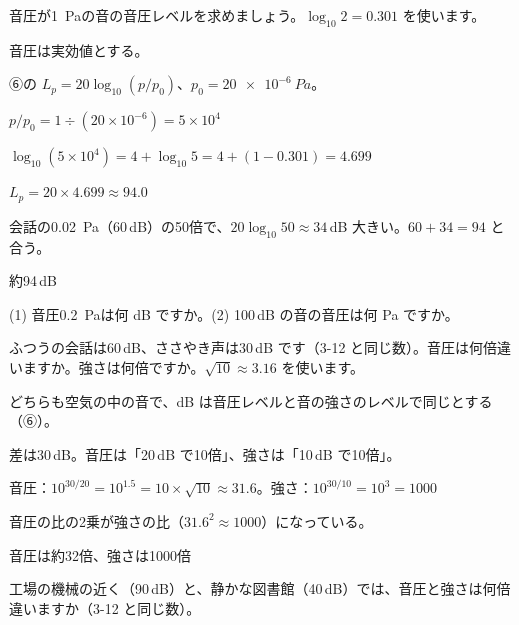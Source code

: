 \begin{reidai}[1 Pa は何 dB？]
\label{ph:波-9:ex7}音圧が\qty{1}{Pa}の音の音圧レベルを求めましょう。$\log_{10}2=0.301$ を使います。
\par{} 音圧は実効値とする。
\par\kangaekata ⑥の $L_p=20\log_{10}(p/p_0)$、$p_0=\qty{20e-6}{Pa}$。
\par\shiki $p/p_0=1\div(20\times10^{-6})=5\times10^4$
\par\hspace*{2\zw}$\log_{10}(5\times10^4)=4+\log_{10}5=4+(1-0.301)=4.699$
\par\hspace*{2\zw}$L_p=20\times4.699\approx94.0$
\par{} 会話の\qty{0.02}{Pa}（60\,dB）の50倍で、$20\log_{10}50\approx34$\,dB 大きい。$60+34=94$ と合う。
\par\kotae 約94\,dB
\end{reidai}
\begin{jibun}
(1) 音圧\qty{0.2}{Pa}は何 dB ですか。(2) 100\,dB の音の音圧は何 Pa ですか。
\end{jibun}

\begin{reidai}[会話とささやき声の音圧の比]
\label{ph:波-9:ex8}ふつうの会話は60\,dB、ささやき声は30\,dB です（3-12 と同じ数）。音圧は何倍違いますか。強さは何倍ですか。$\sqrt{10}\approx3.16$ を使います。
\par{} どちらも空気の中の音で、dB は音圧レベルと音の強さのレベルで同じとする（⑥）。
\par\kangaekata 差は30\,dB。音圧は「20\,dB で10倍」、強さは「10\,dB で10倍」。
\par\shiki 音圧：$10^{30/20}=10^{1.5}=10\times\sqrt{10}\approx31.6$。強さ：$10^{30/10}=10^3=1000$
\par{} 音圧の比の2乗が強さの比（$31.6^2\approx1000$）になっている。
\par\kotae 音圧は約32倍、強さは1000倍
\end{reidai}
\begin{jibun}
工場の機械の近く（90\,dB）と、静かな図書館（40\,dB）では、音圧と強さは何倍違いますか（3-12 と同じ数）。
\end{jibun}

